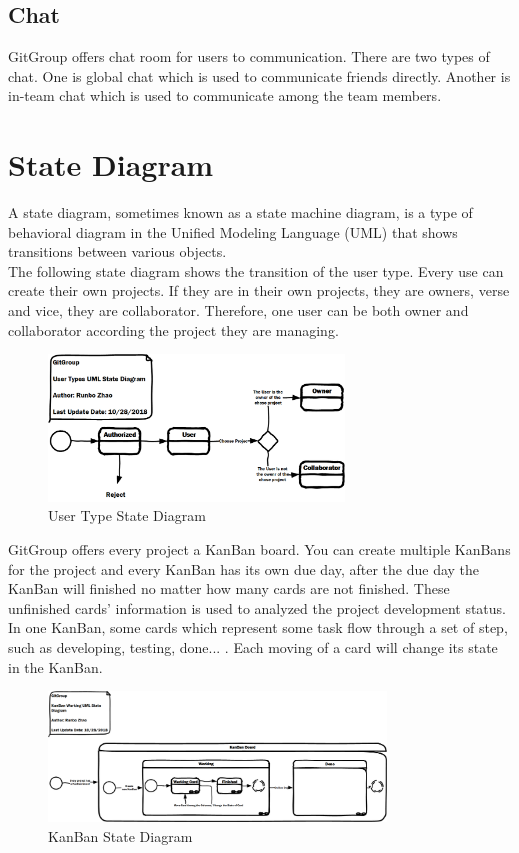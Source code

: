 \documentclass[12pt,a4paper]{report}
\begin{document}
\subsection{Chat}
GitGroup offers chat room for users to communication. There are two types of chat. One is global chat which is used to communicate friends directly. Another is in-team chat which is used to communicate among the team members.
\section{State Diagram}
A state diagram, sometimes known as a state machine diagram, is a type of behavioral diagram in the Unified Modeling Language (UML) that shows transitions between various objects. \\ 
The following state diagram shows the transition of the user type. Every use can create their own projects. If they are in their own projects, they are owners, verse and vice, they are collaborator. Therefore, one user can be both owner and collaborator according the project they are managing.\\
\begin{figure}[H]
	\centering
	\includegraphics[width=0.7\textwidth]{./pics/UserTypeStateDiagram.png}
	\caption{User Type State Diagram }
\end{figure}
GitGroup offers every project a KanBan board. You can create multiple KanBans for the project and every KanBan has its own due day, after the due day the KanBan will finished no matter how many cards are not finished. These unfinished cards' information is used to analyzed the project development status.\\
In one KanBan, some cards which represent some task flow through a set of step, such as developing, testing, done... . Each moving of a card will change its state in the KanBan.
\begin{figure}[H]
	\centering
	\includegraphics[width=0.8\textwidth]{./pics/KanBanStateDiagram.png}
	\caption{KanBan State Diagram }
\end{figure}
\end{document}
